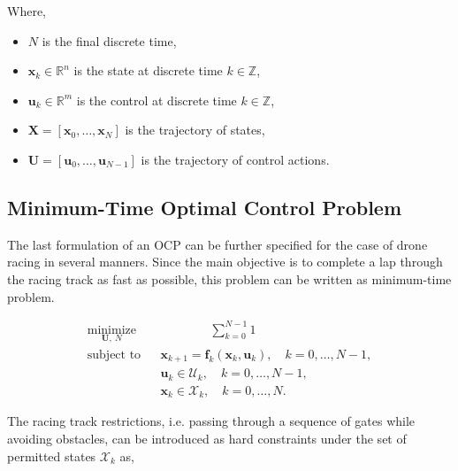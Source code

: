 \noindent Where,
\begin{itemize}
\item[] $N$ is the final discrete time,
\item[] $\boldsymbol{x}_k \in \mathbb{R}^n$ is the state at discrete time $k \in \mathbb{Z}$,
\item[] $\boldsymbol{u}_k \in \mathbb{R}^m$ is the control at discrete time $k \in \mathbb{Z}$,
\item[] $\mathbf{X} = [\boldsymbol{x}_{0}, \dots, \boldsymbol{x}_{N}]$ is the trajectory of states,
\item[] $\mathbf{U} = [\boldsymbol{u}_{0}, \dots, \boldsymbol{u}_{N-1}]$ is the trajectory of control actions.

\end{itemize}

\subsection{Minimum-Time Optimal Control Problem} \label{subsec:minOCP}
The last formulation of an \ac{OCP} can be further specified for the case of drone racing in several manners.
Since the main objective is to complete a lap through the racing track as fast as possible, this problem can be written as minimum-time problem.


\begin{equation}
\begin{aligned}
 & \underset{\mathbf{U},\ N}{\text{minimize}} & & \qquad \qquad \sum_{k=0}^{N-1} 1 \\
 & \text{subject to} & & \boldsymbol{x}_{k+1} = \mathbf{f}_{k}(\boldsymbol{x}_{k}, \boldsymbol{u}_{k}), \quad k = 0, \dots, N-1, & \\
& & & \boldsymbol{u}_{k} \in \mathcal{U}_{k}, \quad k = 0, \dots, N-1, \\
& & & \boldsymbol{x}_{k} \in \mathcal{X}_{k}, \quad k = 0, \dots, N.
\end{aligned}
\label{ocp-eq}
\end{equation}

The racing track restrictions, i.e. passing through a sequence of gates while avoiding
obstacles, can be introduced as hard constraints under the set of permitted states
$\mathcal{X}_k$ as,

